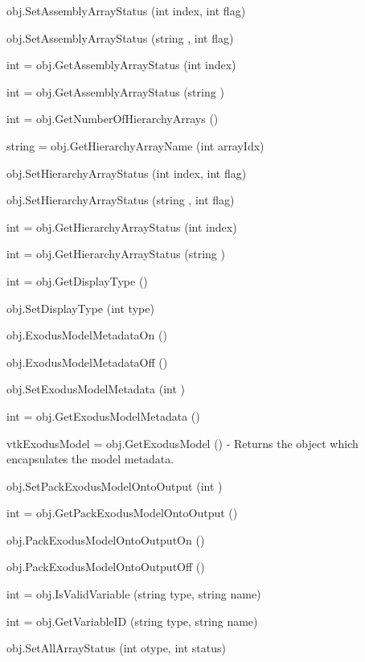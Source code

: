 \begin{DoxyItemize}
\item {\ttfamily obj.\-Set\-Assembly\-Array\-Status (int index, int flag)}  
\item {\ttfamily obj.\-Set\-Assembly\-Array\-Status (string , int flag)}  
\item {\ttfamily int = obj.\-Get\-Assembly\-Array\-Status (int index)}  
\item {\ttfamily int = obj.\-Get\-Assembly\-Array\-Status (string )}  
\item {\ttfamily int = obj.\-Get\-Number\-Of\-Hierarchy\-Arrays ()}  
\item {\ttfamily string = obj.\-Get\-Hierarchy\-Array\-Name (int array\-Idx)}  
\item {\ttfamily obj.\-Set\-Hierarchy\-Array\-Status (int index, int flag)}  
\item {\ttfamily obj.\-Set\-Hierarchy\-Array\-Status (string , int flag)}  
\item {\ttfamily int = obj.\-Get\-Hierarchy\-Array\-Status (int index)}  
\item {\ttfamily int = obj.\-Get\-Hierarchy\-Array\-Status (string )}  
\item {\ttfamily int = obj.\-Get\-Display\-Type ()}  
\item {\ttfamily obj.\-Set\-Display\-Type (int type)}  
\item {\ttfamily obj.\-Exodus\-Model\-Metadata\-On ()}  
\item {\ttfamily obj.\-Exodus\-Model\-Metadata\-Off ()}  
\item {\ttfamily obj.\-Set\-Exodus\-Model\-Metadata (int )}  
\item {\ttfamily int = obj.\-Get\-Exodus\-Model\-Metadata ()}  
\item {\ttfamily vtk\-Exodus\-Model = obj.\-Get\-Exodus\-Model ()} -\/ Returns the object which encapsulates the model metadata.  
\item {\ttfamily obj.\-Set\-Pack\-Exodus\-Model\-Onto\-Output (int )}  
\item {\ttfamily int = obj.\-Get\-Pack\-Exodus\-Model\-Onto\-Output ()}  
\item {\ttfamily obj.\-Pack\-Exodus\-Model\-Onto\-Output\-On ()}  
\item {\ttfamily obj.\-Pack\-Exodus\-Model\-Onto\-Output\-Off ()}  
\item {\ttfamily int = obj.\-Is\-Valid\-Variable (string type, string name)}  
\item {\ttfamily int = obj.\-Get\-Variable\-I\-D (string type, string name)}  
\item {\ttfamily obj.\-Set\-All\-Array\-Status (int otype, int status)}  

\end{DoxyItemize}
